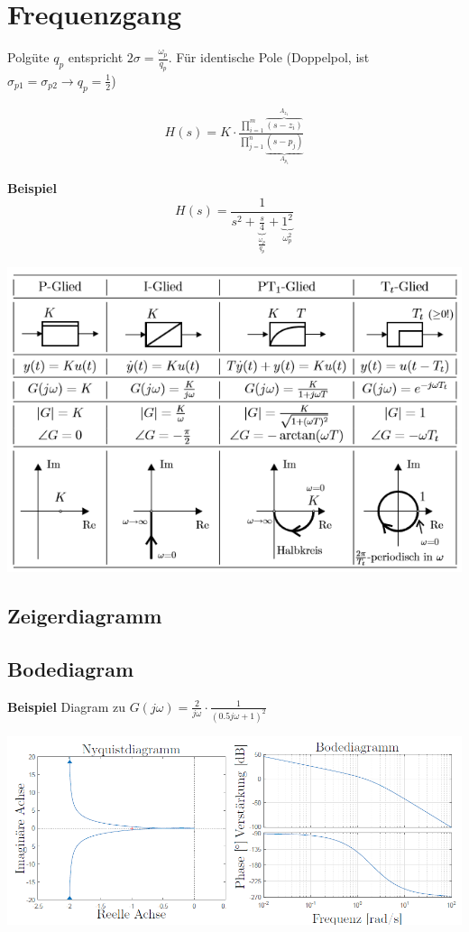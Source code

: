 \section{Frequenzgang}
Polgüte $q_p$ entspricht $2\sigma = \frac{\omega_p}{q_p}$. Für identische Pole (Doppelpol, ist $\sigma_{p1} = \sigma_{p2} \xrightarrow{} q_p = \frac{1}{2}$)

\begin{align*}
	H(s) = K \cdot \frac{\prod\limits_{i=1}^{m}\overbrace{(s - z_i)}^{A_{z_1}}}{\prod\limits_{j=1}^{n}\underbrace{(s - p_j)}_{A_{p_1}}}
\end{align*}


\noindent\textbf{Beispiel}
\[
H(s) = \frac{1}{s^2 + \underbrace{\frac{s}{4}}_{\frac{\omega_p}{q_p}} + \underbrace{1^2}_{\omega_p^2}}
\]

\begin{center}
	\includegraphics[width=\columnwidth]{Images/frequenzgang_grundglieder}
\end{center}


\subsection{Zeigerdiagramm}

\subsection{Bodediagram}
\noindent\textbf{Beispiel}
Diagram zu $G(j\omega) = \frac{2}{j\omega}\cdot \frac{1}{(0.5j\omega + 1)^2}$
\begin{center}
	\includegraphics[width=\columnwidth]{Images/bode}
\end{center}


